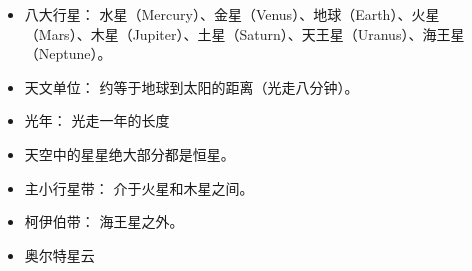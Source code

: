 
\begin{issues}
\issueDraft
\end{issues}

\begin{itemize}
\item 八大行星： 水星（Mercury）、金星（Venus）、地球（Earth）、火星（Mars）、木星（Jupiter）、土星（Saturn）、天王星（Uranus）、海王星（Neptune）。
\item 天文单位： 约等于地球到太阳的距离（光走八分钟）。
\item 光年： 光走一年的长度
\item 天空中的星星绝大部分都是恒星。
\item 主小行星带： 介于火星和木星之间。
\item 柯伊伯带： 海王星之外。
\item 奥尔特星云
\end{itemize}
